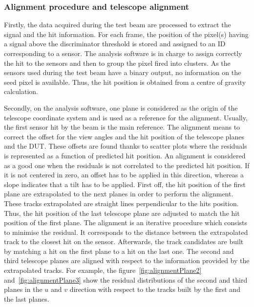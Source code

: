       \subsubsection{Alignment procedure and telescope alignment}

      Firstly, the data acquired during the test beam are processed to extract the signal and the hit information.
      For each frame, the position of the pixel(s) having a signal above the discriminator threshold is stored and assigned to an ID corresponding to a sensor.
      The analysis software is in charge to assign correctly the hit to the sensors and then to group the pixel fired into clusters.
      As the sensors used during the test beam have a binary output, no information on the seed pixel is available.
      Thus, the hit position is obtained from a centre of gravity calculation.

      Secondly, on the analysis software, one plane is considered as the origin of the telescope coordinate system and is used as a reference for the alignment.
      Usually, the first sensor hit by the beam is the main reference.
      The alignment means to correct the offset for the view angles and the hit position of the telescope planes and the \gls{DUT}.
      These offsets are found thanks to scatter plots where the residuals is represented as a function of predicted hit position.
      An alignment is considered as a good one when the residuals is not correlated to the predicted hit position.
      If it is not centered in zero, an offset has to be applied in this direction, whereas a slope indicates that a tilt has to be applied.
      First off, the hit position of the first plane are extrapolated to the next planes in order to perform the alignment.
      These tracks extrapolated are straight lines perpendicular to the hits position.
      Thus, the hit position of the last telescope plane are adjusted to match the hit position of the first plane.
      The alignment is an iterative procedure which consists to minimise the residual. 
      It corresponds to the distance between the extrapolated track to the closest hit on the sensor.
      Afterwards, the track candidates are built by matching a hit on the first plane to a hit on the last one.
      The second and third telescope planes are aligned with respect to the information provided by the extrapolated tracks.
      For example, the figure~\ref{fig:alignmentPlane2} and~\ref{fig:alignmentPlane3} show the residual distributions of the second and third planes in the $u$ and $v$ direction with respect to the tracks built by the first and the last planes.

